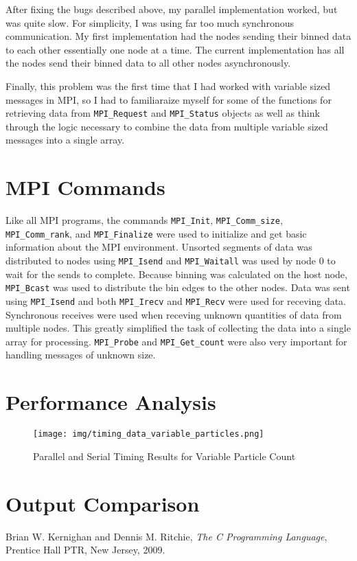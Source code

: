 \documentclass{article}
\begin{document}
After fixing the bugs described above, my parallel implementation worked, but was quite slow. For simplicity, I was using far too much synchronous communication. My first implementation had the nodes sending their binned data to each other essentially one node at a time. The current implementation has all the nodes send their binned data to all other nodes asynchronously.

Finally, this problem was the first time that I had worked with variable sized messages in MPI, so I had to familiaraize myself for some of the functions for retrieving data from \verb!MPI_Request! and \verb!MPI_Status! objects as well as think through the logic necessary to combine the data from multiple variable sized messages into a single array. 

\section{MPI Commands}
Like all MPI programs, the commands \verb!MPI_Init!, \verb!MPI_Comm_size!, \verb!MPI_Comm_rank!, and \verb!MPI_Finalize! were used to initialize and get basic information about the MPI environment. Unsorted segments of data was distributed to nodes using \verb!MPI_Isend! and \verb!MPI_Waitall! was used by node 0 to wait for the sends to complete. Because binning was calculated on the host node, \verb!MPI_Bcast! was used to distribute the bin edges to the other nodes. Data was sent using \verb!MPI_Isend! and both \verb!MPI_Irecv! and \verb!MPI_Recv! were used for receving data. Synchronous receives were used when receving unknown quantities of data from multiple nodes. This greatly simplified the task of collecting the data into a single array for processing. \verb!MPI_Probe! and \verb!MPI_Get_count! were also very important for handling messages of unknown size.

\section{Performance Analysis}

\begin{figure}
\centering
\texttt{[image: img/timing\_data\_variable\_particles.png]}
\caption{Parallel and Serial Timing Results for Variable Particle Count}
\label{chart1}
\end{figure}


\section{Output Comparison}
\label{outputcomp}

\begin{thebibliography}{9}

  Brian W. Kernighan and Dennis M. Ritchie,
  \emph{The C Programming Language},
  Prentice Hall PTR, New Jersey,
  2009.

\end{thebibliography}
\end{document}
